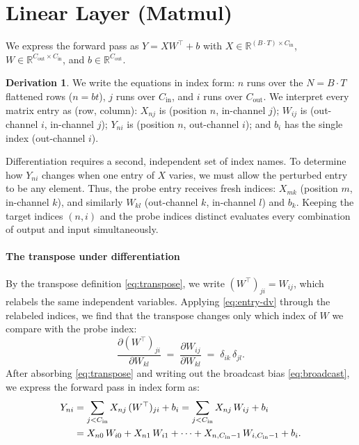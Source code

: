 \documentclass[letterpaper, 10 pt, conference]{ieeeconf}
\newcommand{\R}{\mathbb{R}}
\newcommand{\pdv}[2]{\frac{\partial #1}{\partial #2}}
\newcommand{\kron}[2]{\delta_{#1 #2}}
\theoremstyle{definition}
\newtheorem*{derivation}{Derivation}
\begin{document}
\section{Linear Layer (Matmul)}\label{sec:matmul}

We express the forward pass as $Y = XW^{\top} + b$ with $X \in \R^{(B\cdot T)\times C_{\text{in}}}$, $W \in \R^{C_{\text{out}}\times C_{\text{in}}}$, and $b \in \R^{C_{\text{out}}}$.

\begin{derivation}
  We write the equations in index form: $n$ runs over the $N = B \cdot T$ flattened rows ($n = bt$), $j$ runs over $C_{\text{in}}$, and $i$ runs over $C_{\text{out}}$. We interpret every matrix entry as (row, column): $X_{nj}$ is (position $n$, in-channel $j$); $W_{ij}$ is (out-channel $i$, in-channel $j$); $Y_{ni}$ is (position $n$, out-channel $i$); and $b_i$ has the single index (out-channel $i$).

  Differentiation requires a second, independent set of index names. To determine how $Y_{ni}$ changes when one entry of $X$ varies, we must allow the perturbed entry to be any element. Thus, the probe entry receives fresh indices: $X_{mk}$ (position $m$, in-channel $k$), and similarly $W_{kl}$ (out-channel $k$, in-channel $l$) and $b_k$. Keeping the target indices $(n, i)$ and the probe indices distinct evaluates every combination of output and input simultaneously.

  \paragraph{The transpose under differentiation}
  By the transpose definition \eqref{eq:transpose}, we write $(W^{\top})_{ji} = W_{ij}$, which relabels the same independent variables. Applying \eqref{eq:entry-dv} through the relabeled indices, we find that the transpose changes only which index of $W$ we compare with the probe index:
  \begin{equation}
    \pdv{(W^{\top})_{ji}}{W_{kl}}
    \;=\;
    \pdv{W_{ij}}{W_{kl}}
    \;=\;
    \kron{i}{k}\,\kron{j}{l}.
    \label{eq:transpose-dv}
  \end{equation}
  After absorbing \eqref{eq:transpose} and writing out the broadcast bias \eqref{eq:broadcast}, we express the forward pass in index form as:
  \begin{align}
    Y_{ni}
     & = \sum_{j<C_{\text{in}}} X_{nj}\,(W^{\top})_{ji} + b_i
    = \sum_{j<C_{\text{in}}} X_{nj}\,W_{ij} + b_i \notag      \\
     & = X_{n0}\,W_{i0} + X_{n1}\,W_{i1}
    + \cdots + X_{n,C_{\text{in}}-1}\,W_{i,C_{\text{in}}-1}
    + b_i.
    \label{eq:matmul-fwd-idx}
  \end{align}


\end{derivation}
\end{document}
